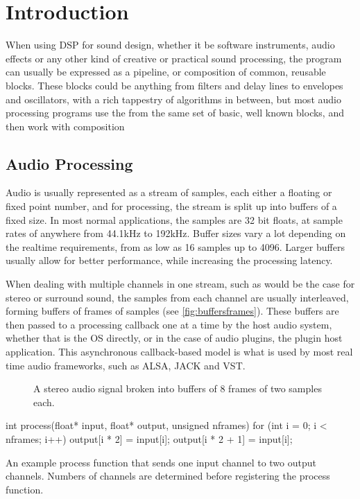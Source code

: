 \chapter{Introduction}

When using DSP for sound design, whether it be software instruments, audio effects or any other kind of
creative or practical sound processing, the program can usually be expressed as a pipeline, or composition of
common, reusable blocks. These blocks could be anything from filters and delay lines to envelopes and
oscillators, with a rich tappestry of algorithms in between, but most audio processing programs use the from
the same set of basic, well known blocks, and then work with composition 

\section{Audio Processing}

Audio is usually represented as a stream of samples, each either a floating or fixed point number, and for
processing, the stream is split up into buffers of a fixed size. In most normal applications, the samples are
32 bit floats, at sample rates of anywhere from 44.1kHz to 192kHz. Buffer sizes vary a lot depending on the
realtime requirements, from as low as 16 samples up to 4096. Larger buffers usually allow for better
performance, while increasing the processing latency.

When dealing with multiple channels in one stream, such as would be the case for stereo or surround sound,
the samples from each channel are usually interleaved, forming buffers of frames of samples (see
\autoref{fig:buffersframes}). These buffers are then passed to a processing callback one at a time by the host
audio system, whether that is the OS directly, or in the case of audio plugins, the plugin host application.
This asynchronous callback-based model is what is used by most real time audio frameworks, such as ALSA, JACK
and VST.

\begin{figure}
  
  \caption{A stereo audio signal broken into buffers of 8 frames of two samples each.}
  \label{fig:buffersframes}
\end{figure}

\begin{listing}[H]
  \begin{cppcodenl}
  int process(float* input, float* output, unsigned nframes) {
    for (int i = 0; i < nframes; i++) {
      output[i * 2] = input[i];
      output[i * 2 + 1] = input[i];
    }
  }
  \end{cppcodenl}
  \label{lst:jackmerge}
  \caption{An example process function that sends one input channel to two output channels. Numbers of channels are
    determined before registering the process function.
  }
\end{listing}

